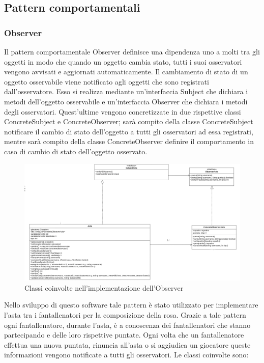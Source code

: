 \documentclass[12pt,a4paper]{article}
\begin{document}
\subsection{Pattern comportamentali}
\subsubsection{Observer}
Il pattern comportamentale Observer definisce una dipendenza uno a molti tra gli oggetti in modo che quando un oggetto cambia stato, tutti i suoi osservatori vengono avvisati e aggiornati automaticamente. Il cambiamento di stato di un oggetto osservabile viene notificato agli oggetti che sono registrati dall'osservatore. Esso si realizza   mediante un'interfaccia Subject che dichiara i metodi dell'oggetto osservabile e un'interfaccia Observer che dichiara i metodi degli osservatori. Quest'ultime vengono concretizzate in due rispettive classi ConcreteSubject e ConcreteObserver; sarà compito della classe  ConcreteSubject notificare il cambio di stato dell'oggetto a tutti gli osservatori ad essa registrati, mentre sarà compito della classe ConcreteObserver definire il comportamento in caso di cambio di stato dell'oggetto osservato.
\begin{figure}[h]
\centering
\includegraphics[width=18 cm ,keepaspectratio]{Observer.png}
\caption{Classi coinvolte nell'implementazione dell'Observer}
\end{figure}
\newline
Nello sviluppo di questo software tale pattern è stato utilizzato per implementare l'asta tra i fantallenatori  per la composizione della rosa. Grazie a tale pattern ogni fantallenatore, durante l'asta, è a conoscenza dei fantallenatori  che stanno partecipando  e delle loro rispettive puntate. Ogni volta che un fantallenatore effettua una nuova puntata, rinuncia all'asta o si aggiudica un giocatore queste informazioni vengono notificate a tutti gli osservatori.  Le classi coinvolte sono:
\end{document}

